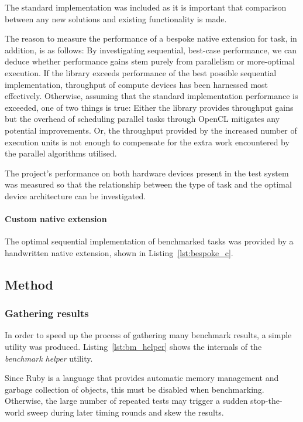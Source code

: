 The standard implementation was included as it is important that comparison between any new solutions and existing functionality is made.

The reason to measure the performance of a bespoke native extension for task, in addition, is as follows:
By investigating sequential, best-case performance, we can deduce whether performance gains stem purely from parallelism or more-optimal execution. If the library exceeds performance of the best possible sequential implementation, throughput of compute devices has been harnessed most effectively. Otherwise, assuming that the standard implementation performance is exceeded, one of two things is true: Either the library provides throughput gains but the overhead of scheduling parallel tasks through \ac{OpenCL} mitigates any potential improvements. Or, the throughput provided by the increased number of execution units is not enough to compensate for the extra work encountered by the parallel algorithms utilised.

The project's performance on both hardware devices present in the test system was measured so that the relationship between the type of task and the optimal device architecture can be investigated.

\paragraph*{Custom native extension}
The optimal sequential implementation of benchmarked tasks was provided by a handwritten native extension, shown in Listing~\ref{lst:bespoke_c}.



\subsection{Method}
\subsubsection{Gathering results}
In order to speed up the process of gathering many benchmark results, a simple utility was produced. Listing~\ref{lst:bm_helper} shows the internals of the \emph{benchmark helper} utility.

Since Ruby is a language that provides automatic memory management and garbage collection of objects, this must be disabled when benchmarking. Otherwise, the large number of repeated tests may trigger a sudden stop-the-world sweep during later timing rounds and skew the results.

